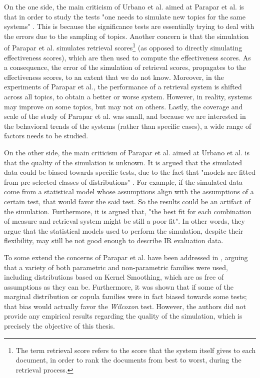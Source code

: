 On the one side, the main criticism of Urbano et al. aimed at Parapar et al. is that in order to study the tests "one needs to simulate new topics for the same systems" \cite{Urbano2019}. This is because the significance tests are essentially trying to deal with the errors due to the sampling of topics. Another concern is that the simulation of Parapar et al. simulates retrieval scores\footnote{The term retrieval score refers to the score that the system itself gives to each document, in order to rank the documents from best to worst, during the retrieval process.} (as opposed to directly simulating effectiveness scores), which are then used to compute the effectiveness scores. As a consequence, the error of the simulation of retrieval scores, propagates to the effectiveness scores, to an extent that we do not know. Moreover, in the experiments of Parapar et al., the performance of a retrieval system is shifted across all topics, to obtain a better or worse system. However, in reality, systems may improve on some topics, but may not on others. Lastly, the coverage and scale of the study of Parapar et al. was small, and because we are interested in the behavioral trends of the systems (rather than specific cases), a wide range of factors needs to be studied. 

On the other side, the main criticism of Parapar et al. aimed at Urbano et al. is that the quality of the simulation is unknown. It is argued that the simulated data could be biased towards specific tests, due to the fact that "models are fitted from pre-selected classes of distributions" \cite{Parapar2021}. For example, if the simulated data come from a statistical model whose assumptions align with the assumptions of a certain test, that would favor the said test. So the results could be an artifact of the simulation. Furthermore, it is argued that, "the best fit for each combination of measure and retrieval system might be still a poor fit". In other words, they argue that the statistical models used to perform the simulation, despite their flexibility, may still be not good enough to describe IR evaluation data.

To some extend the concerns of Parapar et al. have been addressed in \cite{Urbano2021}, arguing that a variety of both parametric and non-parametric families were used, including distributions based on Kernel Smoothing, which are as free of assumptions as they can be. Furthermore, it was shown that if some of the marginal distribution or copula families were in fact biased towards some tests; that bias would actually favor the \textit{Wilcoxon} test. However, the authors did not provide any empirical results regarding the quality of the simulation, which is precisely the objective of this thesis.

